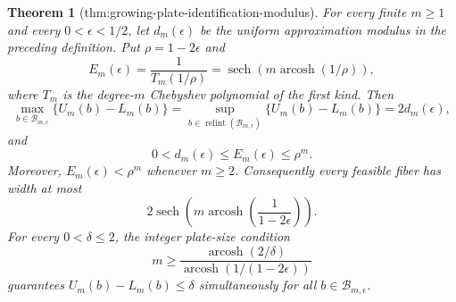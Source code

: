 \documentclass{article}
\newtheorem{theorem}{Theorem}
\begin{document}
\begin{theorem}[thm:growing-plate-identification-modulus]\label{thm:growing-plate-identification-modulus}
For every finite \(m\geq1\) and every \(0<\epsilon<1/2\), let \(d_m(\epsilon)\) be the uniform approximation modulus in the preceding definition.  Put \(\rho=1-2\epsilon\) and
\[
 E_m(\epsilon)=\frac{1}{T_m(1/\rho)}
 =\operatorname{sech}\!\left(m\operatorname{arcosh}(1/\rho)\right),
\]
where \(T_m\) is the degree-\(m\) Chebyshev polynomial of the first kind.  Then
\[
 \max_{b\in\mathcal B_{m,\epsilon}}\{U_m(b)-L_m(b)\}
 =\sup_{b\in\operatorname{relint}(\mathcal B_{m,\epsilon})}\{U_m(b)-L_m(b)\}
 =2d_m(\epsilon),
\]
and
\[
 0<d_m(\epsilon)\leq E_m(\epsilon)\leq\rho^m.
\]
Moreover, \(E_m(\epsilon)<\rho^m\) whenever \(m\geq2\).  Consequently every feasible fiber has width at most
\[
 2\operatorname{sech}\!\left(m\operatorname{arcosh}\!\left(\frac{1}{1-2\epsilon}\right)\right).
\]
For every \(0<\delta\leq2\), the integer plate-size condition
\[
 m\geq
 \frac{\operatorname{arcosh}(2/\delta)}
 {\operatorname{arcosh}(1/(1-2\epsilon))}
\]
guarantees \(U_m(b)-L_m(b)\leq\delta\) simultaneously for all \(b\in\mathcal B_{m,\epsilon}\).
\end{theorem}
\end{document}
